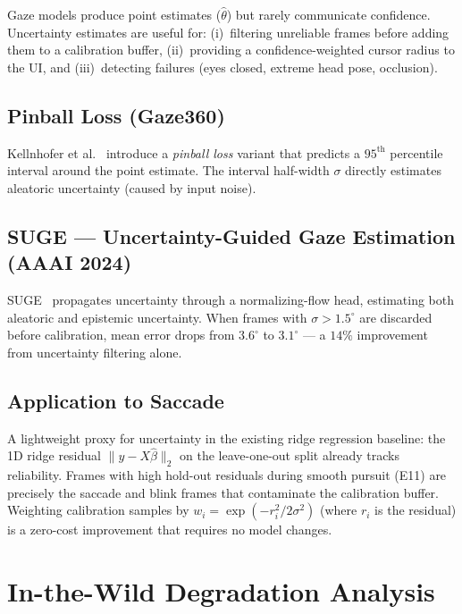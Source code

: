 \documentclass[11pt,a4paper]{article}
\begin{document}
Gaze models produce point estimates ($\hat{\theta}$) but rarely communicate confidence.
Uncertainty estimates are useful for: (i)~filtering unreliable frames before adding them to
a calibration buffer, (ii)~providing a confidence-weighted cursor radius to the UI,
and (iii)~detecting failures (eyes closed, extreme head pose, occlusion).

\subsection{Pinball Loss (Gaze360)}

Kellnhofer et al.~\cite{kellnhofer2019gaze360} introduce a \emph{pinball loss} variant that
predicts a $95^\text{th}$ percentile interval around the point estimate.
The interval half-width $\sigma$ directly estimates aleatoric uncertainty (caused by input noise).

\subsection{SUGE --- Uncertainty-Guided Gaze Estimation (AAAI 2024)}

SUGE~\cite{suge2024} propagates uncertainty through a normalizing-flow head,
estimating both aleatoric and epistemic uncertainty.
When frames with $\sigma > 1.5^\circ$ are discarded before calibration, mean error drops
from $3.6^\circ$ to $3.1^\circ$ --- a $14\%$ improvement from uncertainty filtering alone.

\subsection{Application to Saccade}

A lightweight proxy for uncertainty in the existing ridge regression baseline:
the 1D ridge residual $\|y - X\hat{\beta}\|_2$ on the leave-one-out split already tracks
reliability.  Frames with high hold-out residuals during smooth pursuit (E11) are precisely
the saccade and blink frames that contaminate the calibration buffer.
Weighting calibration samples by $w_i = \exp(-r_i^2 / 2\sigma^2)$ (where $r_i$ is the
residual) is a zero-cost improvement that requires no model changes.

\section{In-the-Wild Degradation Analysis}
\label{sec:degradation}
\end{document}
